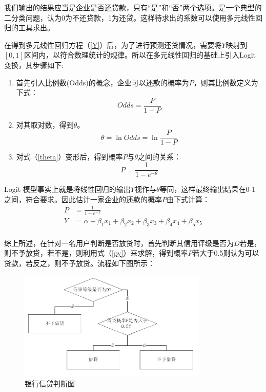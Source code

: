 \documentclass{my_paper}
\begin{document}
我们输出的结果应当是企业是否还贷款，只有“是”和“否”两个选项。是一个典型的二分类问题，认为0为不还贷款，1为还贷。这样待求出的系数可以使用多元线性回归的工具求出。

在得到多元线性回归方程（\ref{Y}）后，为了进行预测还贷情况，需要将$Y$映射到$[0,1]$区间内，以符合数理统计的规律。所以在多元线性回归的基础上引入Logit变换，其步骤如下:

\begin{enumerate}
    \item 首先引入比例数(Odds)的概念，企业可以还款的概率为$P$，则其比例数定义为下式：
    \begin{equation}
    Odds = \frac{P}{1-P}
    \label{odd}
    \end{equation}
    \item 对其取对数，得到$\theta$。
    \begin{equation}
        \theta = \ln Odds = \ln \frac{P}{1-P}
        \label{theta}
    \end{equation}
    \item 对式（\ref{theta}）变形后，得到概率$P$与$\theta$之间的关系：
    \begin{equation}
        P = \frac{1}{1-\mathit{e}^{-\theta}}
    \end{equation}
\end{enumerate}
Logit 模型事实上就是将线性回归的输出$Y$视作与$\theta$等同，这样最终输出结果在0-1之间，符合要求。因此估计一家企业的还款的概率$P$由下式计算：
\begin{equation}
    \begin{aligned}
        P &= \frac{1}{1-\mathit{e}^{-Y}}\\
        Y &= \alpha + \beta_1x_1 +\beta_2x_2 +\beta_3x_3 +\beta_4x_4 +\beta_5x_5 \\
    \end{aligned}
\label{py}
\end{equation}

综上所述，在针对一名用户判断是否放贷时，首先判断其信用评级是否为$D$若是，则不予放贷，若不是，则利用式（\ref{py}）来求解，得到概率$P$若大于0.5则认为可以贷款，若反之，则不予放贷。流程如下图所示：
\begin {figure}[h]
\centering %
\includegraphics[width=0.8\textwidth]{511.png}
\caption{银行信贷判断图} %
\label{five}
\end {figure}
\newpage
\end{document}
